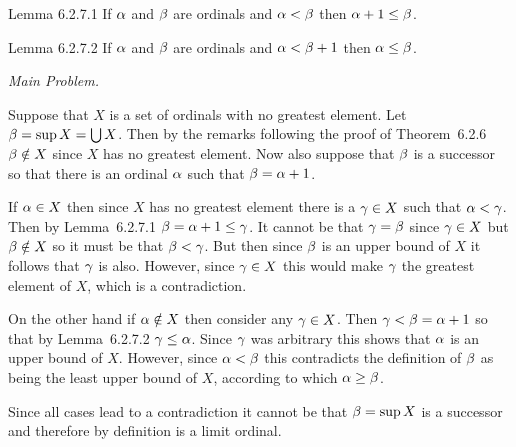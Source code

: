 \begin{solution}

    \begin{statement}{Lemma 6.2.7.1}
        If $\alpha$ and $\beta$ are ordinals and $\alpha < \beta$ then $\alpha+1 \leq \beta$.
    \end{statement}


    \begin{statement}{Lemma 6.2.7.2}
        If $\alpha$ and $\beta$ are ordinals and $\alpha < \beta+1$ then $\alpha \leq \beta$.
    \end{statement}


    \emph{Main Problem.}
    
    Suppose that $X$ is a set of ordinals with no greatest element.
    Let $\beta = \sup{X} = \bigcup X$.
    Then by the remarks following the proof of Theorem~6.2.6 $\beta \notin X$ since $X$ has no greatest element.
    Now also suppose that $\beta$ is a successor so that there is an ordinal $\alpha$ such that $\beta = \alpha+1$.

    If $\alpha \in X$ then since $X$ has no greatest element there is a $\gamma \in X$ such that $\alpha < \gamma$.
    Then by Lemma~6.2.7.1 $\beta = \alpha + 1 \leq \gamma$.
    It cannot be that $\gamma = \beta$ since $\gamma \in X$ but $\beta \notin X$ so it must be that $\beta < \gamma$.
    But then since $\beta$ is an upper bound of $X$ it follows that $\gamma$ is also.
    However, since $\gamma \in X$ this would make $\gamma$ the greatest element of $X$, which is a contradiction.

    On the other hand if $\alpha \notin X$ then consider any $\gamma \in X$.
    Then $\gamma < \beta = \alpha+1$ so that by Lemma~6.2.7.2 $\gamma \leq \alpha$.
    Since $\gamma$ was arbitrary this shows that $\alpha$ is an upper bound of $X$.
    However, since $\alpha < \beta$ this contradicts the definition of $\beta$ as being the least upper bound of $X$, according to which $\alpha \geq \beta$.

    Since all cases lead to a contradiction it cannot be that $\beta = \sup{X}$ is a successor and therefore by definition is a limit ordinal. \qedsymbol
\end{solution}

